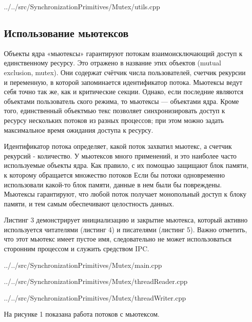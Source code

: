\documentclass[a4paper, 12pt]{article}		%
\begin{document}

{../../src/SynchronizationPrimitives/Mutex/utils.cpp}

\newpage
\subsection{Использование мьютексов}

Объекты ядра «мьютексы» гарантируют потокам взаимоисключающий доступ к единственному ресурсу. Это отражено в название этих объектов (mutual exclusion, mutex). Они содержат счётчик числа пользователей, счетчик рекурсии и переменную, в которой запоминается идентификатор потока. Мьютексы ведут себя точно так же, как и критические секции. Однако, если последние являются объектами пользователь ского режима, то мьютексы — объектами ядра. Кроме того, единственный объектмью текс позволяет синхронизировать доступ к ресурсу нескольких потоков из разных процессов; при этом можно задать максимальное время ожидания доступа к ресурсу.

Идентификатор потока определяет, какой поток захватил мьютекс, а счетчик рекурсий - количество. У мьютексов много применений, и это наиболее часто используемые объекты ядра. Как правило, с их помощью защищают блок памяти, к которому обращается множество потоков Если бы потоки одновременно использовали какой-то блок памяти, данные в нем были бы повреждены. Мьютексы гарантируют, что любой поток получает монопольный доступ к блоку памяти, и тем самым обеспечивают целостность данных.

Листинг 3 демонстрирует инициализацию и закрытие мьютекса, который активно используется читателями (листинг 4) и писателями (листинг 5). Важно отметить, что этот мьютекс имеет пустое имя, следовательно не может использоваться сторонним процессом и служить средством IPC.


{../../src/SynchronizationPrimitives/Mutex/main.cpp}


{../../src/SynchronizationPrimitives/Mutex/threadReader.cpp}


{../../src/SynchronizationPrimitives/Mutex/threadWriter.cpp}

На рисунке 1 показана работа потоков с мьютексом.
\end{document}
